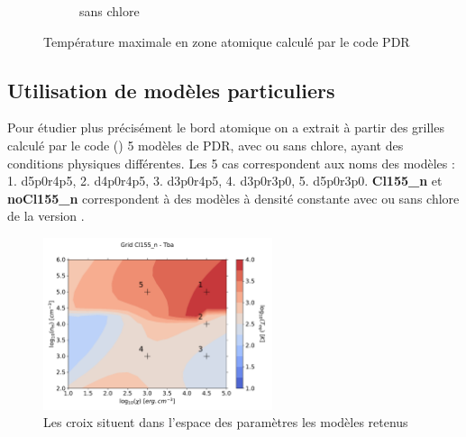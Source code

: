 \begin{figure}[!htbp]
\begin{subfigure}[t]{0.45\textwidth}
        \caption{sans chlore}
    \end{subfigure}
    \caption{Température maximale en zone atomique calculé par le code PDR \uncinq}
    \label{fig:Cl:grid:mapTmax}
\end{figure}

\subsection{Utilisation de modèles particuliers}

Pour étudier plus précisément le bord atomique on a extrait à partir des grilles calculé par le code (\uncinq) 5 modèles de PDR, avec ou sans chlore, ayant des conditions physiques différentes. Les 5 cas correspondent aux noms des modèles : 1. d5p0r4p5, 2. d4p0r4p5, 3. d3p0r4p5, 4. d3p0r3p0,  5. d5p0r3p0. \textbf{Cl155\_n} et \textbf{noCl155\_n} correspondent à des modèles à densité constante avec ou sans chlore de la version \uncinq. \newline

\begin{figure}[!htbp]
    \centering
        \centering \includegraphics[trim = {0 0 0 1.5cm},clip,width=0.6\textwidth]{figure/Cl/grid/mapT_cross.pdf}
        \caption{Les croix situent dans l'espace des paramètres les modèles retenus}
\end{figure}

